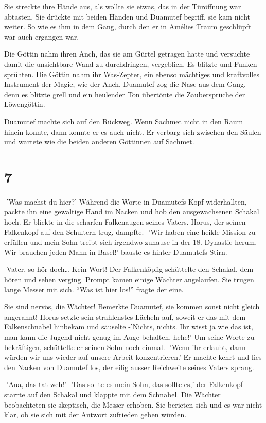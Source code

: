 \documentclass[11pt,titlepage,a5paper]{book}
\begin{document}
Sie streckte ihre Hände aus, als wollte sie etwas, das in der Türöffnung war abtasten. Sie drückte mit beiden Händen und Duamutef begriff, sie kam nicht weiter. So wie es ihm in dem Gang, durch den er in Amélies Traum geschlüpft war auch ergangen war.

Die Göttin nahm ihren Anch, das sie am Gürtel getragen hatte und versuchte damit die unsichtbare Wand zu durchdringen, vergeblich. Es blitzte und Funken sprühten. Die Göttin nahm ihr Was-Zepter, ein ebenso mächtiges und kraftvolles Instrument der Magie, wie der Anch. Duamutef zog die Nase aus dem Gang, denn es blitzte grell und ein heulender Ton übertönte die Zaubersprüche der Löwengöttin.

Duamutef machte sich auf den Rückweg. Wenn Sachmet nicht in den Raum hinein konnte, dann konnte er es auch nicht. Er verbarg sich zwischen den Säulen und wartete wie die beiden anderen Göttinnen auf Sachmet.

\section*{7}

-'Was machst du hier?' Während die Worte in Duamutefs Kopf widerhallten, packte ihn eine gewaltige Hand im Nacken und hob den ausgewachsenen Schakal hoch. Er blickte in die scharfen Falkenaugen seines Vaters. Horus, der seinen Falkenkopf auf den Schultern trug, dampfte. -'Wir haben eine heikle Mission zu erfüllen und mein Sohn treibt sich irgendwo zuhause in der 18. Dynastie herum. Wir brauchen jeden Mann in Basel!' bauste es hinter Duamutefs Stirn.

-Vater, so hör doch\dots -Kein Wort! Der Falkenköpfig schüttelte den Schakal, dem hören und sehen verging. Prompt kamen einige Wächter angelaufen. Sie trugen lange Messer mit sich. "`Was ist hier los!"' fragte der eine. 

Sie sind nervös, die Wächter! Bemerkte Duamutef, sie kommen sonst nicht gleich angerannt! Horus setzte sein strahlenstes Lächeln auf, soweit er das mit dem Falkenschnabel hinbekam und säuselte -'Nichts, nichts. Ihr wisst ja wie das ist, man kann die Jugend nicht genug im Auge behalten, hehe!' Um seine Worte zu bekräftigen, schüttelte er seinen Sohn noch einmal. -'Wenn ihr erlaubt, dann würden wir uns wieder auf unsere Arbeit konzentrieren.' Er machte kehrt und lies den Nacken von Duamutef los, der eilig ausser Reichweite seines Vaters sprang.

-'Aua, das tat weh!' -'Das sollte es mein Sohn, das sollte es,' der Falkenkopf starrte auf den Schakal und klappte mit dem Schnabel. Die Wächter beobachteten sie skeptisch, die Messer erhoben. Sie berieten sich und es war nicht klar, ob sie sich mit der Antwort zufrieden geben würden. 
\end{document}
